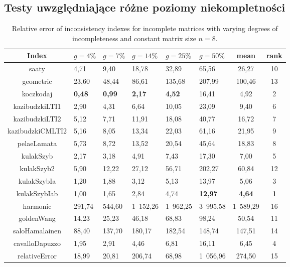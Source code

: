 \subsection{Testy uwzględniające różne poziomy niekompletności}
\begin{table}[ht]
\begin{center}
\caption{Relative error of inconsistency indexes for incomplete matrices with varying degrees of incompleteness and constant matrix size $n=8$.}
\label{tab:results1}
\begin{tabular}{|c||l|l|l|l|l|c||c|}
\hline Index & $g=4\%$ & $g=7\%$ & $g=14\%$ & $g=25\%$ & $g=50\%$ & mean & rank \\ \hline \hline
saaty & 4,71 & 9,40 & 18,78 & 32,89 & 65,56 & 26,27 & 10 \\ \hline
geometric & 23,60 & 48,44 & 86,61 & 135,68 & 207,99 & 100,46  & 13 \\ \hline
koczkodaj & \textbf{0,48} & \textbf{0,99} & \textbf{2,17} & \textbf{4,52} & 16,41 & 4,92 & 2 \\ \hline
kazibudzkiLTI1 & 2,90 & 4,31 & 6,64 & 10,05 & 23,09 & 9,40 & 6 \\ \hline
kazibudzkiLTI2 & 5,12 & 7,71 & 11,91 & 18,08 & 40,77 & 16,72 & 7 \\ \hline
kazibudzkiCMLTI2 & 5,16 & 8,05 & 13,34 & 22,03 & 61,16 & 21,95 & 9 \\ \hline
pelaeLamata & 5,73 & 8,72 & 13,52 & 20,54 & 45,64 & 18,83 & 8 \\ \hline
kulakSzyb & 2,17 & 3,18 & 4,91 & 7,43 & 17,30 & 7,00 & 5 \\ \hline
kulakSzyb2 & 5,90 & 12,22 & 27,12 & 56,71 & 202,27 & 60,84 & 12 \\ \hline
kulakSzybIa & 1,20 & 1,88 & 3,12 & 5,13 & 13,97 & 5,06 & 3 \\ \hline
kulakSzybIab & 1,00 & 1,65 & 2,84 & 4,74 & \textbf{12,97} & \textbf{4,64} & \textbf{1} \\ \hline
harmonic & 291,74 & 544,60 & 1 152,26 & 1 962,25 & 3 995,58 & 1 589,29 & 16 \\ \hline
goldenWang & 14,23 & 25,23 & 46,18 & 68,83 & 98,24 & 50,54 & 11 \\ \hline
saloHamalainen & 88,40 & 137,70 & 180,17 & 182,54 & 148,74 & 147,51 & 14 \\ \hline
cavalloDapuzzo & 1,95 & 2,91 & 4,46 & 6,81 & 16,11 & 6,45 & 4 \\ \hline
relativeError & 18,99 & 20,81 & 206,74 & 68,98 & 1 056,96 & 274,50 & 15 \\ \hline
\end{tabular}
\end{center}
\end{table}

